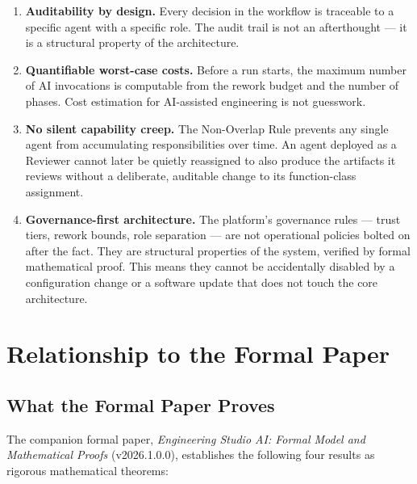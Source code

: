 \documentclass[12pt]{article}
\begin{document}
\begin{enumerate}
    \item \textbf{Auditability by design.}
          Every decision in the workflow is traceable to a specific
          agent with a specific role.
          The audit trail is not an afterthought --- it is a
          structural property of the architecture.

    \item \textbf{Quantifiable worst-case costs.}
          Before a run starts, the maximum number of AI invocations
          is computable from the rework budget and the number of
          phases.
          Cost estimation for AI-assisted engineering is not
          guesswork.

    \item \textbf{No silent capability creep.}
          The Non-Overlap Rule prevents any single agent from
          accumulating responsibilities over time.
          An agent deployed as a Reviewer cannot later be quietly
          reassigned to also produce the artifacts it reviews without
          a deliberate, auditable change to its function-class
          assignment.

    \item \textbf{Governance-first architecture.}
          The platform's governance rules --- trust tiers, rework
          bounds, role separation --- are not operational policies
          bolted on after the fact.
          They are structural properties of the system, verified by
          formal mathematical proof.
          This means they cannot be accidentally disabled by a
          configuration change or a software update that does not
          touch the core architecture.
\end{enumerate}

\section{Relationship to the Formal Paper}
\label{sec:formal}

\subsection{What the Formal Paper Proves}

The companion formal paper,
\textit{Engineering Studio AI: Formal Model and Mathematical Proofs}
(v2026.1.0.0), establishes the following four results as rigorous
mathematical theorems:
\end{document}
